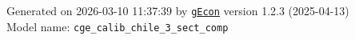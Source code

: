\documentclass[10pt,a4paper]{article}
\numberwithin{equation}{section}
\begin{document}
\begin{landscape}
\begin{flushleft}{\large
Generated  on 2026-03-10 11:37:39 by \href{http://gecon.r-forge.r-project.org/}{\texttt{gEcon}} version 1.2.3 (2025-04-13)\\
Model name: \verb+cge_calib_chile_3_sect_comp+
}\end{flushleft}


\end{landscape}

\end{document}
